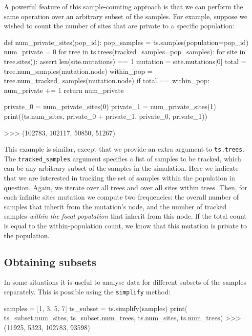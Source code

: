 \documentclass[graybox]{svmult}
\begin{document}
A powerful feature of this sample-counting approach is that we can
perform the same operation over an arbitrary subset of the samples. For
example, suppose we wished to count the number of sites that are private
to a specific population:

\begin{pythoncode}
def num_private_sites(pop_id):
    pop_samples = ts.samples(population=pop_id)
    num_private = 0
    for tree in ts.trees(tracked_samples=pop_samples):
        for site in tree.sites():
            assert len(site.mutations) == 1
            mutation = site.mutations[0]
            total = tree.num_samples(mutation.node)
            within_pop = tree.num_tracked_samples(mutation.node)
            if total == within_pop:
                num_private += 1
    return num_private

private_0 = num_private_sites(0)
private_1 = num_private_sites(1)
print((ts.num_sites, private_0 + private_1, private_0, private_1))

>>> (102783, 102117, 50850, 51267)
\end{pythoncode}

    This example is similar, except that we provide an extra argument to
\texttt{ts.trees}. The \texttt{tracked\_samples} argument specifies a list of samples to be tracked, which can be
any arbitrary subset of the samples in the simulation. Here we indicate
that we are interested in tracking the set of samples within the
population in question. Again, we iterate over all trees and over all
sites within trees. Then, for each infinite sites mutation we
compute two frequencies: the overall number of samples that inherit from
the mutation's node, and the number of tracked samples \emph{within the focal
population} that inherit from this node. If the total count is
equal to the within-population count, we know that this mutation is private to the population.

\subsection{Obtaining subsets}\label{obtaining-subsets}

In some situations it is useful to analyse data for different subsets of
the samples separately. This is possible using the \texttt{simplify}
method:

\begin{pythoncode}
samples = [1, 3, 5, 7]
ts_subset = ts.simplify(samples)
print(
    ts_subset.num_sites, ts_subset.num_trees,
    ts.num_sites, ts.num_trees)
>>> (11925, 5323, 102783, 93598)
\end{pythoncode}
\end{document}
